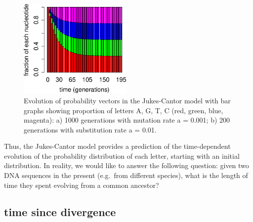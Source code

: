 \documentclass[
  letterpaper,
  DIV=11,
  numbers=noendperiod]{scrreprt}
\begin{document}
\begin{figure}

{\centering \includegraphics[width=0.49\textwidth,height=\textheight]{./markov_eigen_files/figure-pdf/bio14-1-2.pdf}

}

\caption{Evolution of probability vectors in the Jukes-Cantor model with
bar graphs showing proportion of letters A, G, T, C (red, green, blue,
magenta): a) 1000 generations with mutation rate a = 0.001; b) 200
generations with substitution rate a = 0.01.}

\end{figure}

Thus, the Jukes-Cantor model provides a prediction of the time-dependent
evolution of the probability distribution of each letter, starting with
an initial distribution. In reality, we would like to answer the
following question: given two DNA sequences in the present (e.g.~from
different species), what is the length of time they spent evolving from
a common ancestor?

\hypertarget{time-since-divergence}{%
\subsection{time since divergence}\label{time-since-divergence}}
\end{document}
